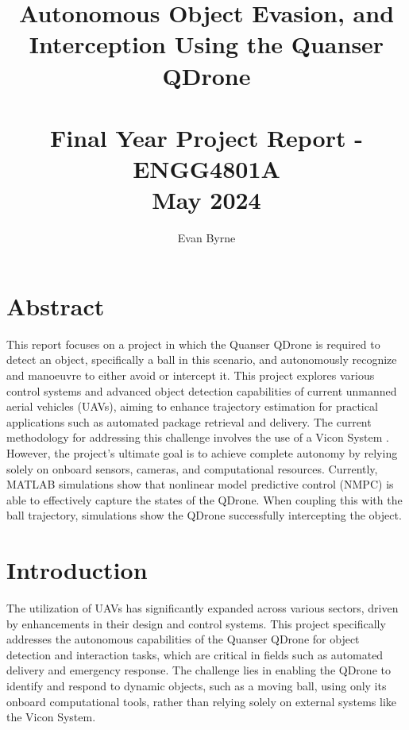 \documentclass{UoNMCHA}
\numberwithin{equation}{section}
\begin{document}
\title{Autonomous Object Evasion, and Interception Using the Quanser QDrone\\ \ \\
{\small Final Year Project Report - ENGG4801A \\May 2024}}
\author[UoNMCHA]{Evan Byrne}
\address[UoNMCHA]{
Student of Mechatronics Engineering,\\
The University of Newcastle, Callaghan, NSW 2308, AUSTRALIA \\
Student Number: 3349681 \\
E-mail: \href{mailto:Evan.Byrne@uon.edu.au}{\textsf{Evan.Byrne@uon.edu.au}}}
\maketitle
\onecolumn

\vspace{-5mm}
\section*{Abstract}
\vspace{5mm}
This report focuses on a project in which the Quanser QDrone \cite{website:Quanser} is required to detect an object, specifically a ball in this scenario, and autonomously recognize and manoeuvre to either avoid or intercept it. This project explores various control systems and advanced object detection capabilities of current unmanned aerial vehicles (UAVs), aiming to enhance trajectory estimation for practical applications such as automated package retrieval and delivery. 
The current methodology for addressing this challenge involves the use of a Vicon System \cite{website:Vicon}. However, the project's ultimate goal is to achieve complete autonomy by relying solely on onboard sensors, cameras, and computational resources. Currently, MATLAB simulations show that nonlinear model predictive control (NMPC) \cite{website:NLMPC} is able to effectively capture the states of the QDrone. When coupling this with the ball trajectory, simulations show the QDrone successfully intercepting the object.

\newpage
\tableofcontents
\newpage

\section{Introduction}
The utilization of UAVs has significantly expanded across various sectors, driven by enhancements in their design and control systems. This project specifically addresses the autonomous capabilities of the Quanser QDrone for object detection and interaction tasks, which are critical in fields such as automated delivery and emergency response. The challenge lies in enabling the QDrone to identify and respond to dynamic objects, such as a moving ball, using only its onboard computational tools, rather than relying solely on external systems like the Vicon System.
\end{document}
